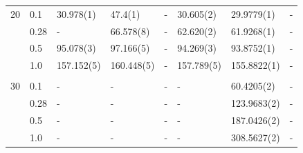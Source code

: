 \begin{table} [H]
\begin{tabularx}{\textwidth}{l:l|XXXXXX}
		20 & 0.1 & 30.978(1) & 47.4(1) & - & 30.605(2) & 29.9779(1) & - \\ 
		& 0.28 & - & 66.578(8) & - & 62.620(2) & 61.9268(1) & - \\
		& 0.5 & 95.078(3) & 97.166(5) & - & 94.269(3) & 93.8752(1) & - \\
		& 1.0 & 157.152(5) & 160.448(5) & - & 157.789(5) & 155.8822(1) & - \\ \hdashline \\
		
		30 & 0.1 & - & - & - & - & 60.4205(2) & -\\ 
		& 0.28 & - & - & - & - & 123.9683(2) & - \\
		& 0.5 & - & - & - & - & 187.0426(2) & -\\
		& 1.0 & - & - & - & - & 308.5627(2) & -\\ \hline\hline
	\end{tabularx}
\end{table}

